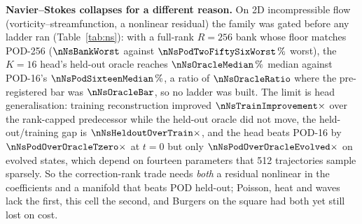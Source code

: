\textbf{Navier--Stokes collapses for a different reason.} On 2D incompressible
flow (vorticity--streamfunction, a nonlinear residual) the family was gated
before any ladder ran (Table~\ref{tab:ns}): with a full-rank $R=256$ bank whose
floor matches POD-256 ($\nNsBankWorst$ against $\nNsPodTwoFiftySixWorst\,\%$
worst), the $K=16$ head's held-out oracle reaches $\nNsOracleMedian\,\%$ median
against POD-16's $\nNsPodSixteenMedian\,\%$, a ratio of $\nNsOracleRatio$ where
the pre-registered bar was $\nNsOracleBar$, so no ladder was built. The limit is
head generalisation: training reconstruction improved
$\nNsTrainImprovement\times$ over the rank-capped predecessor while the held-out
oracle did not move, the held-out/training gap is $\nNsHeldoutOverTrain\times$,
and the head beats POD-16 by $\nNsPodOverOracleTzero\times$ at $t=0$ but only
$\nNsPodOverOracleEvolved\times$ on evolved states, which depend on fourteen
parameters that 512 trajectories sample sparsely. So the correction-rank trade
needs \emph{both} a residual nonlinear in the coefficients and a manifold that
beats POD held-out; Poisson, heat and waves lack the first, this cell the
second, and Burgers on the square had both yet still lost on cost.

